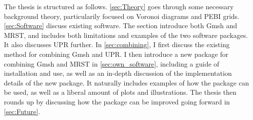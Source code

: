 The thesis is structured as follows. \autoref{sec:Theory} goes through some necessary background theory, particularily focused on Voronoi diagrams and PEBI grids. \autoref{sec:Software} discuss existing software. The section introduce both Gmsh and MRST, and includes both limitations and examples of the two software packages. It also discusses UPR further. In \autoref{sec:combining}, I first discuss the existing method for combining Gmsh and UPR. I then introduce a new package for combining Gmsh and MRST in \autoref{sec:own_software}, including a guide of installation and use, as well as an in-depth discussion of the implementation details of the new package. It naturally includes examples of how the package can be used, as well as a liberal amount of plots and illustrations. The thesis then rounds up by discussing how the package can be improved going forward in \autoref{sec:Future}.